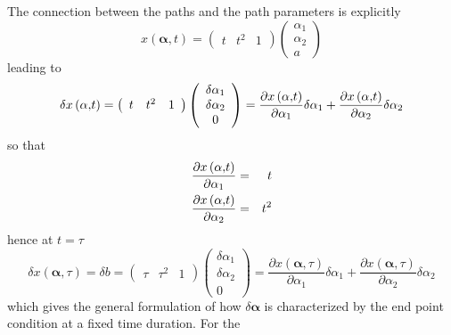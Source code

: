\documentclass[aps,preprint]{revtex4}
\begin{document}
The connection between the paths and the path parameters is explicitly%
\begin{equation}
x\left( \mathbf{\alpha ,}t\right) =\left(
\begin{array}{ccc}
t & t^{2} & 1%
\end{array}%
\right) \left(
\begin{array}{c}
\alpha _{1} \\
\alpha _{2} \\
a%
\end{array}%
\right)
\end{equation}%
leading to
\begin{equation}
\delta x\left( \mathbf{\alpha ,}t\right) =\left(
\begin{array}{ccc}
t & t^{2} & 1%
\end{array}%
\right) \left(
\begin{array}{c}
\delta \alpha _{1} \\
\delta \alpha _{2} \\
0%
\end{array}%
\right) =\frac{\partial x\left( \mathbf{\alpha ,}t\right) }{\partial \alpha
_{1}}\delta \alpha _{1}+\frac{\partial x\left( \mathbf{\alpha ,}t\right) }{%
\partial \alpha _{2}}\delta \alpha _{2}
\end{equation}%
so that
\begin{eqnarray}
\frac{\partial x\left( \mathbf{\alpha ,}t\right) }{\partial \alpha _{1}} &=&t
\notag \\
\frac{\partial x\left( \mathbf{\alpha ,}t\right) }{\partial \alpha _{2}}
&=&t^{2}
\end{eqnarray}%
hence at $t=\tau $
\begin{equation}
\delta x\left( \mathbf{\alpha ,}\tau \right) =\delta b=\left(
\begin{array}{ccc}
\tau & \tau ^{2} & 1%
\end{array}%
\right) \left(
\begin{array}{c}
\delta \alpha _{1} \\
\delta \alpha _{2} \\
0%
\end{array}%
\right) =\frac{\partial x\left( \mathbf{\alpha ,}\tau \right) }{\partial
\alpha _{1}}\delta \alpha _{1}+\frac{\partial x\left( \mathbf{\alpha ,}\tau
\right) }{\partial \alpha _{2}}\delta \alpha _{2}
\end{equation}%
which gives the general formulation of how $\delta \mathbf{\alpha }$ is
characterized by the end point condition at a fixed time duration. For the
\end{document}
